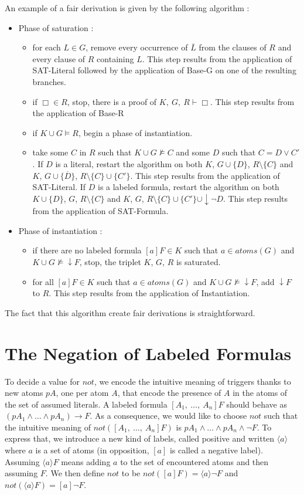 \documentclass[a4paper,10pt]{report}
\newcommand{\atoms}{\mathit{atoms}}
\newcommand{\gen}{\vdash}
\newcommand{\nnot}{\mathit{not}}
\begin{document}
\noindent
An example of a fair derivation is given by the following algorithm :
\begin{itemize}
 \item Phase of saturation :
   \begin{itemize}
    \item for each $L\in G$, remove every occurrence of $\overline L$ from the clauses of $R$ and
every clause of $R$ containing $L$. This step results from the application of {\sc SAT-Literal}
followed by the application of {\sc Base-G} on one of the resulting branches.
    \item if $\Box\in R$, stop, there is a proof of $K,\ G,\ R\gen\Box$.
This step results from the application of {\sc Base-R}
    \item if $K\cup G\vDash R$, begin a phase of instantiation.
    \item take some $C$ in $R$ such that $K\cup G\nvDash C$ and some $D$ such that $C=D\vee C'$.
If $D$ is a literal, restart the algorithm on both $K$, $G\cup\{D\}$, $R\setminus\{C\}$ and
$K$, $G\cup\{\overline D\}$, $R\setminus\{C\}\cup\{C'\}$. This step results from the application
of {\sc SAT-Literal}. If $D$ is a labeled formula, restart the algorithm on both
$K\cup\{D\}$, $G$, $R\setminus\{C\}$ and
$K$, $G$, $R\setminus\{C\}\cup\{C'\}\cup\downarrow\neg D$. This step results from the application
of {\sc SAT-Formula}.
   \end{itemize}
 \item Phase of instantiation :
   \begin{itemize}
    \item if there are no labeled formula $[a]F\in K$ such that $a\in\atoms(G)$ and
$K\cup G\nvDash\downarrow F$, stop, the triplet $K$, $G$, $R$ is saturated.
    \item for all $[a]F\in K$ such that $a\in\atoms(G)$ and $K\cup G\nvDash\downarrow F$,
add $\downarrow F$ to $R$. This step results from the application of {\sc Instantiation}.
   \end{itemize}
\end{itemize}
The fact that this algorithm create fair derivations is straightforward.

\section{The Negation of Labeled Formulas}
To decide a value for $\nnot$, we encode the intuitive meaning of triggers thanks to new atoms
$pA$, one per atom $A$, that encode the presence of $A$ in the atoms of the set of assumed literals.
A labeled formula $[A_1,\ \dots,\ A_n]F$ should behave as $(pA_1\wedge\dots\wedge pA_n)\rightarrow F$.
As a consequence, we would like to choose $\nnot$ such that the intuitive meaning of
$\nnot([A_1,\ \dots,\ A_n]F)$ is $pA_1\wedge\dots\wedge pA_n\wedge\neg F$. To express that,
we introduce a new kind of labels, called positive and written $\langle a\rangle$ where $a$ is a set
of atoms (in opposition, $[a]$ is called a negative label). Assuming $\langle a\rangle F$
means adding $a$ to the set of encountered atoms and then assuming $F$. We then define $\nnot$ to be
$\nnot([a]F)=\langle a\rangle\neg F$ and $\nnot(\langle a\rangle F)=[a]\neg F$.
\end{document}
